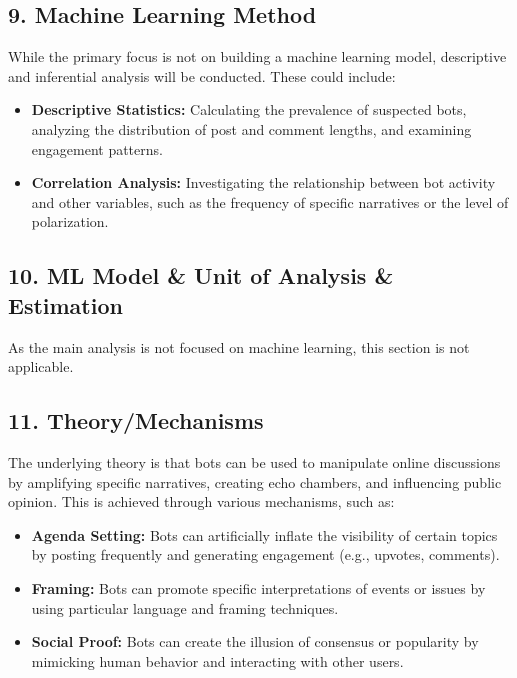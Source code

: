 \documentclass[
  letterpaper,
  DIV=11,
  numbers=noendperiod]{scrartcl}
\providecommand{\tightlist}{%
  \setlength{\itemsep}{0pt}\setlength{\parskip}{0pt}}\usepackage{longtable,booktabs,array}
\begin{document}
\subsection{9. Machine Learning Method}\label{machine-learning-method}

While the primary focus is not on building a machine learning model,
descriptive and inferential analysis will be conducted. These could
include:

\begin{itemize}
\tightlist
\item
  \textbf{Descriptive Statistics:} Calculating the prevalence of
  suspected bots, analyzing the distribution of post and comment
  lengths, and examining engagement patterns.
\item
  \textbf{Correlation Analysis:} Investigating the relationship between
  bot activity and other variables, such as the frequency of specific
  narratives or the level of polarization.
\end{itemize}

\subsection{10. ML Model \& Unit of Analysis \&
Estimation}\label{ml-model-unit-of-analysis-estimation}

As the main analysis is not focused on machine learning, this section is
not applicable.

\subsection{11. Theory/Mechanisms}\label{theorymechanisms}

The underlying theory is that bots can be used to manipulate online
discussions by amplifying specific narratives, creating echo chambers,
and influencing public opinion. This is achieved through various
mechanisms, such as:

\begin{itemize}
\tightlist
\item
  \textbf{Agenda Setting:} Bots can artificially inflate the visibility
  of certain topics by posting frequently and generating engagement
  (e.g., upvotes, comments).
\item
  \textbf{Framing:} Bots can promote specific interpretations of events
  or issues by using particular language and framing techniques.
\item
  \textbf{Social Proof:} Bots can create the illusion of consensus or
  popularity by mimicking human behavior and interacting with other
  users.
\end{itemize}
\end{document}
